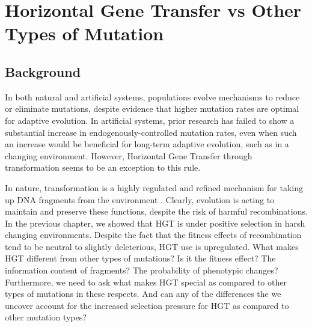\documentclass[PhD]{msu-thesis}
\begin{document}
\chapter{Horizontal Gene Transfer vs Other Types of Mutation}
\label{chap:hgt-preferred}
\section{Background}

In both natural and artificial systems, populations evolve mechanisms to reduce or eliminate mutations\cite{wielgoss_mutation_2013}, despite evidence that higher mutation rates are optimal for adaptive evolution\cite{clune_natural_2008}.
In artificial systems, prior research has failed to show a substantial increase in endogenously-controlled mutation rates, even when such an increase would be beneficial for long-term adaptive evolution, such as in a changing environment\cite{clune_natural_2008}.
However, Horizontal Gene Transfer through transformation seems to be an exception to this rule.  

In nature, transformation is a highly regulated and refined mechanism for taking up DNA fragments from the environment \cite{solomon_whos_1996,seitz_cues_2013,fontaine_novel_2010}. 
Clearly, evolution is acting to maintain and preserve these functions, despite the risk of harmful recombinations. In the previous chapter, we showed that HGT is under positive selection in harsh changing environments. Despite the fact that the fitness effects of recombination tend to be neutral to slightly deleterious, HGT use is upregulated. What makes HGT different from other types of mutations? Is it the fitness effect?
The information content of fragments? The probability of phenotypic changes? Furthermore, we need to ask what makes HGT special as compared to other types of mutations in these respects. And can any of the differences the we uncover account for the increased selection pressure for HGT as compared to other mutation types? 
\end{document}
